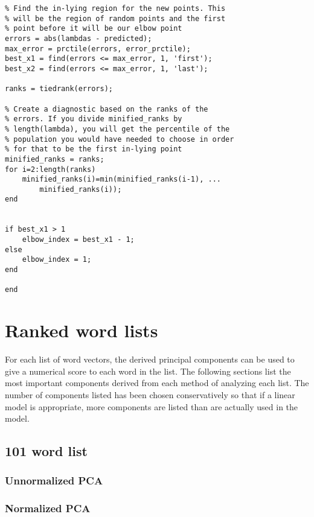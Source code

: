 \documentclass[eric_thesis.tex]{subfiles}
\begin{document}
\begin{lstlisting}
% Find the in-lying region for the new points. This
% will be the region of random points and the first
% point before it will be our elbow point
errors = abs(lambdas - predicted);
max_error = prctile(errors, error_prctile);
best_x1 = find(errors <= max_error, 1, 'first');
best_x2 = find(errors <= max_error, 1, 'last');

ranks = tiedrank(errors);

% Create a diagnostic based on the ranks of the
% errors. If you divide minified_ranks by 
% length(lambda), you will get the percentile of the
% population you would have needed to choose in order
% for that to be the first in-lying point
minified_ranks = ranks;
for i=2:length(ranks)
    minified_ranks(i)=min(minified_ranks(i-1), ...
        minified_ranks(i)); 
end


if best_x1 > 1
    elbow_index = best_x1 - 1;
else
    elbow_index = 1;
end

end
\end{lstlisting}

\chapter{Ranked word lists}
\label{app:rankedwordlists}
For each list of word vectors, the derived principal components can be used to 
give a numerical score to each word in the list. The following sections list
the most important components derived from each method of analyzing each list.
The number of components listed has been chosen conservatively so that if a
linear model is appropriate, more components are listed than are actually used
in the model.

\section{101 word list}
\subsection{Unnormalized PCA}
\label{app:rankedwordlists:101words:unnormalized}

\subsection{Normalized PCA}
\label{app:rankedwordlists:101words:normalized}

\end{document}
